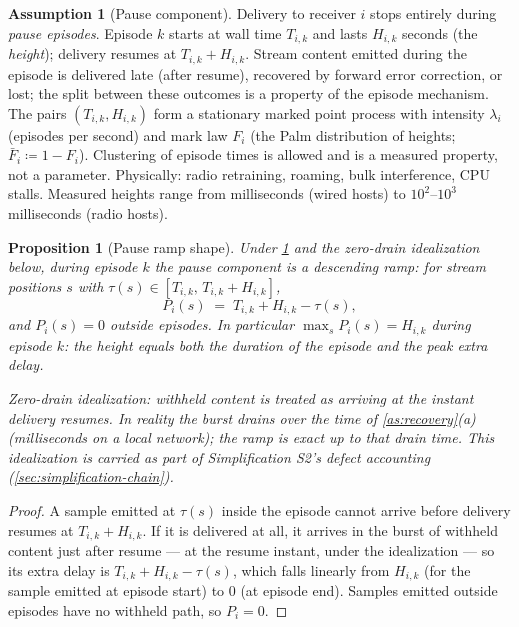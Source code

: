 \documentclass[11pt, a4paper]{article}
\theoremstyle{definition}
\newtheorem{assumption}{Assumption}[section]
\theoremstyle{plain}
\newtheorem{proposition}[theorem]{Proposition}
\theoremstyle{remark}
\begin{document}
\begin{assumption}[Pause component]\label{as:pause}
Delivery to receiver $i$ stops entirely during \emph{pause episodes}.
Episode $k$ starts at wall time $T_{i,k}$ and lasts $H_{i,k}$ seconds
(the \emph{height}); delivery resumes at $T_{i,k} + H_{i,k}$.  Stream
content emitted during the episode is delivered late (after resume),
recovered by forward error correction, or lost; the split between these
outcomes is a property of the episode mechanism.  The pairs
$(T_{i,k}, H_{i,k})$ form a stationary marked point process with
intensity $\lambda_i$ (episodes per second) and mark law $F_i$ (the Palm
distribution of heights; $\bar F_i \coloneqq 1 - F_i$).  Clustering of
episode times is allowed and is a measured property, not a parameter.
Physically: radio retraining, roaming, bulk interference, CPU stalls.
Measured heights range from milliseconds (wired hosts) to $10^2$--$10^3$
milliseconds (radio hosts).
\end{assumption}

\begin{proposition}[Pause ramp shape]\label{prop:ramp}
Under \cref{as:pause} and the zero-drain idealization below, during
episode $k$ the pause component is a descending ramp: for stream
positions $s$ with $\tau(s) \in [T_{i,k},\, T_{i,k}+H_{i,k}]$,
\begin{equation}\label{eq:ramp}
  P_i(s) \;=\; T_{i,k} + H_{i,k} - \tau(s),
\end{equation}
and $P_i(s) = 0$ outside episodes.  In particular
$\max_s P_i(s) = H_{i,k}$ during episode $k$: the height equals both the
duration of the episode and the peak extra delay.

\emph{Zero-drain idealization:} withheld content is treated as arriving
at the instant delivery resumes.  In reality the burst drains over the
time of \cref{as:recovery}(a) (milliseconds on a local network); the
ramp is exact up to that drain time.  This idealization is carried as
part of Simplification S2's defect accounting
(\cref{sec:simplification-chain}).
\end{proposition}

\begin{proof}
A sample emitted at $\tau(s)$ inside the episode cannot arrive before
delivery resumes at $T_{i,k}+H_{i,k}$.  If it is delivered at all, it
arrives in the burst of withheld content just after resume --- at the
resume instant, under the idealization --- so its extra delay is
$T_{i,k}+H_{i,k}-\tau(s)$, which falls linearly from $H_{i,k}$ (for the
sample emitted at episode start) to $0$ (at episode end).  Samples
emitted outside episodes have no withheld path, so $P_i = 0$.
\end{proof}
\end{document}
